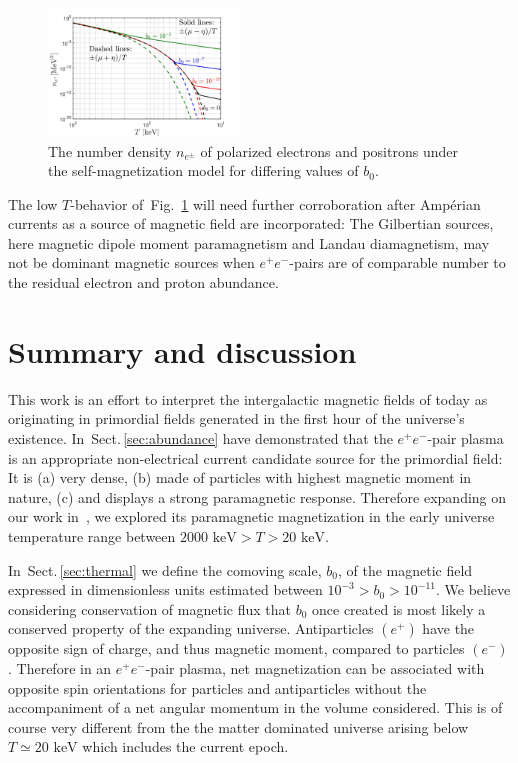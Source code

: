 \documentclass[aps,prd,floatfix,reprint]{revtex4-2}
\newcommand*{\keV}{\text{ keV}}
\newcommand{\rf}[1]{Fig.~{\ref{#1}}}
\newcommand{\rsec}[1]{Sect.\,{\ref{#1}}}
\begin{document}
\begin{figure}%
 \centering
\includegraphics[width=0.45\textwidth]{plots/ElectronDenisty_SpinChemicalPotential004.jpg}
 \caption{The number density $n_{e^{\pm}}$ of polarized electrons and positrons under the self-magnetization model for differing values of $b_{0}$.}
 \label{fig:polarswap} 
\end{figure}

The low $T$-behavior of~\rf{fig:polarswap} will need further corroboration after Amp{\'e}rian currents as a source of magnetic field are incorporated: The Gilbertian sources, here magnetic dipole moment paramagnetism and Landau diamagnetism, may not be dominant magnetic sources when $e^{+}e^{-}$-pairs are of comparable number to the residual electron and proton abundance.

\section{Summary and discussion}
\label{sec:conclusions}
\noindent This work is an effort to interpret the intergalactic magnetic fields of today as originating in primordial fields generated in the first hour of the universe's existence. In~\rsec{sec:abundance} have demonstrated that the $e^{+}e^{-}$-pair plasma is an appropriate non-electrical current candidate source for the primordial field: It is (a) very dense, (b) made of particles with highest magnetic moment in nature, (c) and displays a strong paramagnetic response. Therefore expanding on our work in~\cite{Rafelski:2023emw}, we explored its paramagnetic magnetization in the early universe temperature range between $2000\keV>T>20\keV$. 

In~\rsec{sec:thermal} we define the comoving scale, $b_{0}$, of the magnetic field expressed in dimensionless units estimated between $10^{-3}>b_{0}>10^{-11}$. We believe considering conservation of magnetic flux that $b_{0}$ once created is most likely a conserved property of the expanding universe. Antiparticles $(e^{+})$ have the opposite sign of charge, and thus magnetic moment, compared to particles $(e^{-})$. Therefore in an $e^{+}e^{-}$-pair plasma, net magnetization can be associated with opposite spin orientations for particles and antiparticles without the accompaniment of a net angular momentum in the volume considered. This is of course very different from the the matter dominated universe arising below $T\simeq 20\keV$ which includes the current epoch.  
\end{document}
